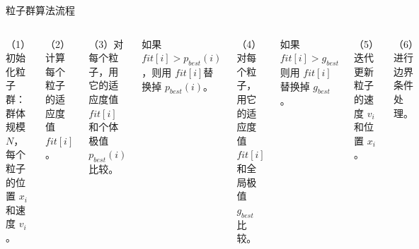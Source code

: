 \documentclass[xcolor=table,dvipsnames,svgnames,aspectratio=169,fontset=ubuntu]{ctexbeamer}
\begin{document}
\begin{frame}{粒子群算法流程}
\begin{columns}
（1）初始化粒子群：群体规模  $N$，每个粒子的位置 $x_i$ 和速度 $v_i$。 

（2）计算每个粒子的适应度值 $fit[i]$。 

（3）对每个粒子，用它的适应度值 $fit[i]$ 和个体极值 $p_{best}(i)$ 比较。

\qquad 如果 $fit[i] > p_{best}(i)$，则用 $fit[i]$替换掉 $p_{best}(i)$。 

（4）对每个粒子，用它的适应度值 $fit[i]$ 和全局极值 $g_{best}$ 比较。

\qquad 如果 $fit[i] > g_{best}$ 则用 $fit[i]$替换掉 $g_{best}$。 

（5）迭代更新粒子的速度 $v_i$ 和位置 $x_i$。 

（6）进行边界条件处理。


\end{columns}
\end{frame}
\end{document}
